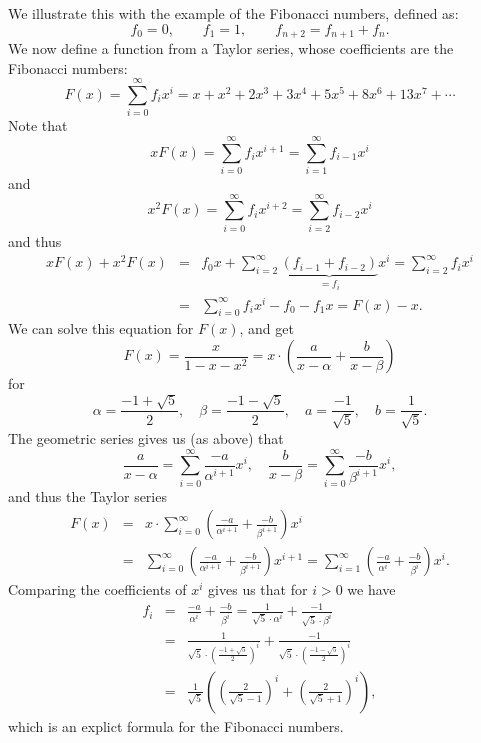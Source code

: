 We illustrate this with the example of the Fibonacci
numbers, defined as:
\[
f_0=0,\qquad f_1=1,\qquad f_{n+2}=f_{n+1}+f_n.
\]
We now define a function from a Taylor series, whose coefficients are the
Fibonacci numbers:
\[
F(x)=\sum_{i=0}^\infty f_i x^i=x+x^2+2x^3+3x^4+5x^5+8x^6+13x^7+\cdots
\]
Note that
\[
xF(x)=\sum_{i=0}^\infty f_i x^{i+1}=\sum_{i=1}^\infty f_{i-1} x^i
\]
and
\[
x^2F(x)=\sum_{i=0}^\infty f_i x^{i+2}=\sum_{i=2}^\infty f_{i-2} x^i
\]
and thus
\begin{eqnarray*}
xF(x)+x^2F(x)&=&f_0x+\sum_{i=2}^\infty \underbrace{(f_{i-1}+f_{i-2})}_{=f_i} x^i
=\sum_{i=2}^\infty f_i x^i\\
&=&\sum_{i=0}^\infty f_i x^i-f_0-f_1x=F(x)-x.
\end{eqnarray*}
We can solve this equation for $F(x)$, and get
\[
F(x)=\frac{x}{1-x-x^2}=x\cdot\left(\frac{a}{x-\alpha}+\frac{b}{x-\beta}\right)
\]
for
\[
\alpha=\frac{-1+\sqrt{5}}{2},\quad\beta=\frac{-1-\sqrt{5}}{2},\quad
a=\frac{-1}{\sqrt{5}},\quad b=\frac{1}{\sqrt{5}}.
\]
The geometric series gives us (as above) that 
\[
\frac{a}{x-\alpha}=\sum_{i=0}^\infty \frac{-a}{\alpha^{i+1}}x^i,\quad
\frac{b}{x-\beta}=\sum_{i=0}^\infty \frac{-b}{\beta^{i+1}}x^i,
\]
and thus the Taylor series
\begin{eqnarray*}
F(x)&=& x\cdot
\sum_{i=0}^\infty\left(\frac{-a}{\alpha^{i+1}}+\frac{-b}{\beta^{i+1}}\right)x^i\\
&=&
\sum_{i=0}^\infty\left(\frac{-a}{\alpha^{i+1}}+\frac{-b}{\beta^{i+1}}\right)x^{i+1}
=\sum_{i=1}^\infty\left(\frac{-a}{\alpha^{i}}+\frac{-b}{\beta^{i}}\right)x^{i}.
\end{eqnarray*}
Comparing the coefficients of $x^i$ gives us that for $i>0$ we have
\begin{eqnarray*}
f_i&=&\frac{-a}{\alpha^{i}}+\frac{-b}{\beta^{i}}
=
\frac{1}{\sqrt{5}\cdot \alpha^i}+\frac{-1}{\sqrt{5}\cdot \beta^i}\\
&=&
\frac{1}{\sqrt{5}\cdot \left(\frac{-1+\sqrt{5}}{2}\right)^i}
+\frac{-1}{\sqrt{5}\cdot \left(\frac{-1-\sqrt{5}}{2}\right)^i}\\
&=&\frac{1}{\sqrt{5}}\left(\left(\frac{2}{\sqrt{5}-1}\right)^i+\left(\frac{2}{\sqrt{5}+1}\right)^i\right),
\end{eqnarray*}
which is an explict formula for the Fibonacci numbers.
